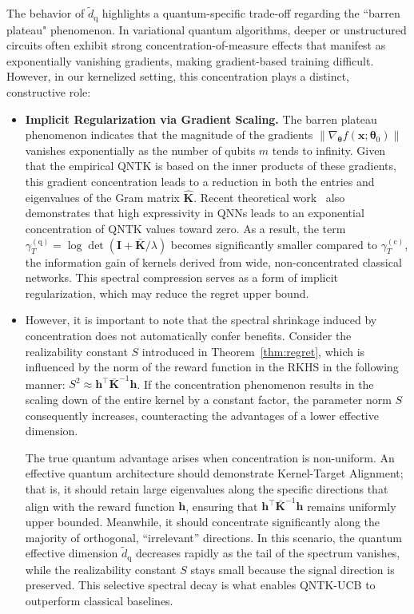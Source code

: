 \documentclass[pdflatex,sn-mathphys-num]{sn-jnl}%
\theoremstyle{thmstyleone}%
\theoremstyle{thmstyletwo}%
\theoremstyle{thmstylethree}%
\newcommand{\xbf}{\mathbf{x}}
\newcommand{\Kbf}{\mathbf{K}}
\newcommand{\Ibf}{\mathbf{I}}
\newcommand{\hbf}{\mathbf{h}}
\begin{document}
The behavior of $\widetilde{d}_{\mathrm{q}}$ highlights a quantum-specific trade-off regarding the ``barren plateau" phenomenon. In variational quantum algorithms, deeper or unstructured circuits often exhibit strong concentration-of-measure effects that manifest as exponentially vanishing gradients, making gradient-based training difficult. However, in our kernelized setting, this concentration plays a distinct, constructive role:
\begin{itemize}
    \item \textbf{Implicit Regularization via Gradient Scaling.}  The barren plateau phenomenon indicates that the magnitude of the gradients \( \|\nabla_{\bm{\theta}} f(\xbf; \bm{\theta}_0)\| \) vanishes exponentially as the number of qubits $m$ tends to infinity. Given that the empirical QNTK is based on the inner products of these gradients, this gradient concentration leads to a reduction in both the entries and eigenvalues of the Gram matrix \(\hat{\Kbf}\). Recent theoretical work~\cite{exp_conc_qntk} also demonstrates that high expressivity in QNNs leads to an exponential concentration of QNTK values toward zero. As a result, the term \(\gamma_T^{(\mathrm{q})} = \log\det(\Ibf + \bar{\Kbf}/\lambda) \) becomes significantly smaller compared to \(\gamma_T^{(\mathrm{c})}\),  the information gain of  kernels derived from wide, non-concentrated classical networks. This spectral compression serves as a form of implicit regularization, which may reduce the regret upper bound. 

\item However, it is important to note that the spectral shrinkage induced by concentration does not automatically confer benefits. Consider the realizability constant $S$ introduced in Theorem~\ref{thm:regret}, which is influenced by the norm of the reward function in the RKHS in the following manner:  $S^2 \approx \hbf^\top \bar{\Kbf}^{-1} \hbf$. If the   concentration phenomenon results in the  scaling down of the entire kernel by a constant factor, the parameter norm $S$ consequently increases, counteracting the advantages of a lower effective dimension.

The true quantum advantage arises when concentration is non-uniform. An effective quantum architecture should demonstrate Kernel-Target Alignment; that is, it should retain large eigenvalues along the specific directions that align with  the reward function \(\hbf\), ensuring that \(\hbf^\top \bar{\Kbf}^{-1} \hbf\) remains uniformly upper bounded. Meanwhile, it should concentrate significantly along the majority of orthogonal, ``irrelevant'' directions. In this scenario, the quantum effective dimension   $\widetilde{d}_{\mathrm{q}}$  decreases rapidly as the tail of the spectrum vanishes, while the realizability constant \(S\) stays small because the signal direction is preserved. This selective spectral decay is what enables QNTK-UCB to outperform classical baselines.
    

\end{itemize}
\end{document}
